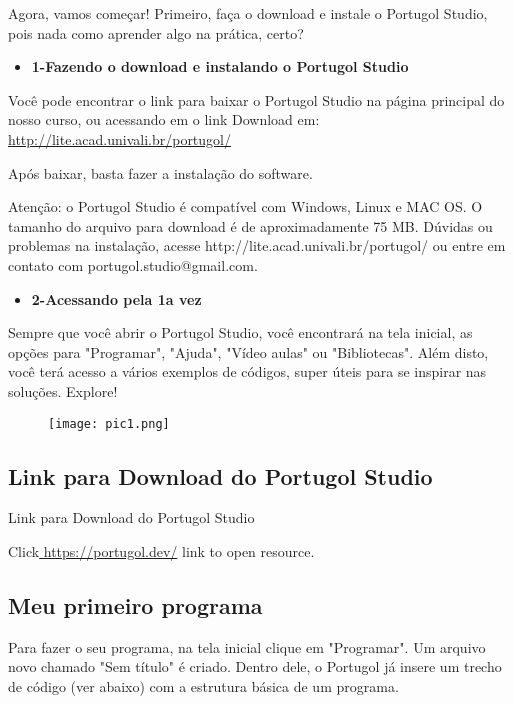 \documentclass{article}
\begin{document}
Agora, vamos começar! Primeiro, faça o download e instale o Portugol Studio, pois nada como aprender algo na prática, certo?


\begin{itemize}
    \item \textbf{1-Fazendo o download e instalando o Portugol Studio}
\end{itemize}
Você pode encontrar o link para baixar o Portugol Studio na página principal do nosso curso, ou acessando em o link Download em: \href{http://lite.acad.univali.br/portugol/}{http://lite.acad.univali.br/portugol/}

Após baixar, basta fazer a instalação do software.

Atenção: o Portugol Studio é compatível com Windows, Linux e MAC OS. O tamanho do arquivo para download é de aproximadamente 75 MB. Dúvidas ou problemas na instalação, acesse http://lite.acad.univali.br/portugol/ ou entre em contato com portugol.studio@gmail.com. 

\begin{itemize}
    \item \textbf{2-Acessando pela 1a vez}
\end{itemize}

Sempre que você abrir o Portugol Studio, você encontrará na tela inicial, as opções para "Programar", "Ajuda", "Vídeo aulas" ou "Bibliotecas". Além disto, você terá acesso a vários exemplos de códigos, super úteis para se inspirar nas soluções. Explore!


\begin{figure}[H]
    \centering
    \texttt{[image: pic1.png]}
    \label{fig:pic1}
\end{figure}

\subsection{Link para Download do Portugol Studio}
 Link para Download do Portugol Studio

Click\href{ https://portugol.dev/}{ https://portugol.dev/} link to open resource.

\subsection{Meu primeiro programa}
Para fazer o seu programa, na tela inicial clique em "Programar". Um arquivo novo chamado "Sem título" é criado. Dentro dele, o Portugol já insere um trecho de código (ver abaixo) com a estrutura básica de um programa.
\end{document}
